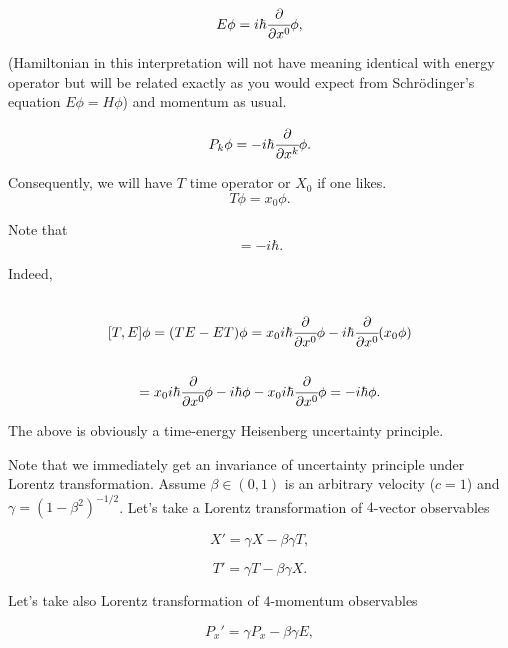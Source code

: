 \documentclass[main.tex]{subfiles}
\begin{document}
\begin{equation}
E\phi = i\hbar \cfrac{\partial}{\partial x^0} \phi,
\end{equation}

(Hamiltonian in this interpretation will not have meaning identical with energy operator but will be related exactly as you would expect from Schrödinger's equation $E\phi = H\phi$) and momentum as usual.

\begin{equation}
P_k\phi = - i\hbar \cfrac{\partial}{\partial x^k} \phi.
\end{equation}

Consequently, we will have $T$ time operator or $X_0$ if one likes.
\begin{equation}
T\phi = x_0\phi.
\end{equation}

Note that
\begin{equation}
[T, E] = -i\hbar{}.
\end{equation}

Indeed,
\begin{multline*}
\\
[T, E]\phi = (TE - ET)\phi = x_0 i\hbar\cfrac{\partial}{\partial x^0} \phi - i\hbar\cfrac{\partial}{\partial x^0}(x_0\phi)\\
\\ =  x_0 i\hbar\cfrac{\partial}{\partial x^0} \phi - i\hbar \phi - x_0 i\hbar\cfrac{\partial}
{\partial x^0} \phi
= - i\hbar \phi.
\\
\end{multline*}

The above is obviously a time-energy Heisenberg uncertainty principle. 

Note that we immediately get an invariance of uncertainty principle under Lorentz transformation. Assume $\beta\in (0, 1)$ is an arbitrary velocity ($c = 1$) and $\gamma = (1 - \beta^2)^{-1/2}$.  Let's take a Lorentz transformation of $4$-vector observables

\begin{equation}
X' = \gamma X - \beta\gamma T,
\end{equation}

\begin{equation}
T' = \gamma T - \beta \gamma X.
\end{equation} 

Let's take also Lorentz transformation of $4$-momentum observables

\begin{equation}
P_x' = \gamma P_x - \beta\gamma E,
\end{equation}
\end{document}
